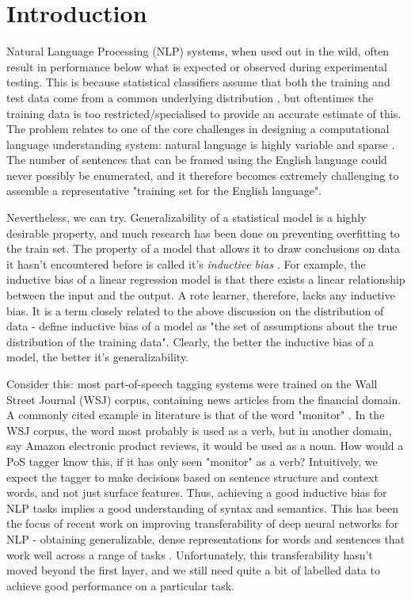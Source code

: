 \documentclass[12pt]{report}
\begin{document}
	\section{Introduction}
	Natural Language Processing (NLP) systems, when used out in the wild, often result in performance below what is expected or observed during experimental testing. This is because statistical classifiers assume that both the training and test data come from a common underlying distribution \citep{li2012literature}, but oftentimes the training data is too restricted/specialised to provide an accurate estimate of this. The problem relates to one of the core challenges in designing a computational language understanding system: natural language is highly variable and sparse \citep{goldberg2017neural}. The number of sentences that can be framed using the English language could never possibly be enumerated, and it therefore becomes extremely challenging to assemble a representative "training set for the English language". 
	\par
	Nevertheless, we can try. Generalizability of a statistical model is a highly desirable property, and much research has been done on preventing overfitting to the train set. The property of a model that allows it to draw conclusions on data it hasn't encountered before is called it's \textit{inductive bias} \citep{baxter2000model}. For example, the inductive bias of a linear regression model is that there exists a linear relationship between the input and the output. A rote learner, therefore, lacks any inductive bias. It is a term closely related to the above discussion on the distribution of data - \citep{torrey2010transfer} define inductive bias of a model as "the set of assumptions about the true distribution of the training data". Clearly, the better the inductive bias of a model, the better it's generalizability.
	\par
	Consider this: most part-of-speech tagging systems were trained on the Wall Street Journal (WSJ) corpus, containing news articles from the financial domain. A commonly cited example in literature is that of the word "monitor" \citep{li2012literature}. In the WSJ corpus, the word most probably is used as a verb, but in another domain, say Amazon electronic product reviews, it would be used as a noun. How would a PoS tagger know this, if it has only seen "monitor" as a verb? Intuitively, we expect the tagger to make decisions based on sentence structure and context words, and not just surface features. Thus, achieving a good inductive bias for NLP tasks implies a good understanding of syntax and semantics. This has been the focus of recent work on improving transferability of deep neural networks for NLP - obtaining generalizable, dense representations for words and sentences that work well across a range of tasks \citep{peters2018deep}. Unfortunately, this transferability hasn't moved beyond the first layer, and  we still need quite a bit of labelled data to achieve good performance on a particular task.
\end{document}

